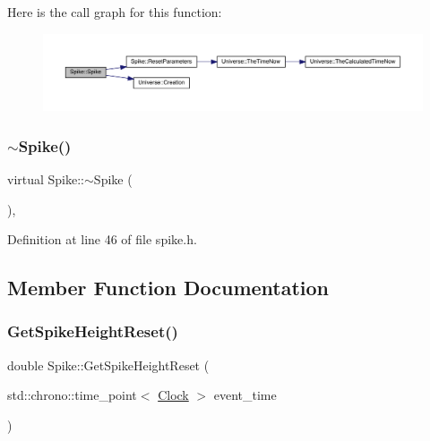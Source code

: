Here is the call graph for this function\+:\nopagebreak
\begin{figure}[H]
\begin{center}
\leavevmode
\includegraphics[width=350pt]{class_spike_afecf811f48103b529016a73349b50fe4_cgraph}
\end{center}
\end{figure}
\mbox{\label{class_spike_a6c2c62e81cb32ca4eb73bc686974d00d}} 
\subsubsection{\texorpdfstring{$\sim$\+Spike()}{~Spike()}}
{\footnotesize\ttfamily virtual Spike\+::$\sim$\+Spike (\begin{DoxyParamCaption}{ }\end{DoxyParamCaption})\hspace{0.3cm}{\ttfamily [inline]}, {\ttfamily [virtual]}}



Definition at line 46 of file spike.\+h.



\subsection{Member Function Documentation}
\mbox{\label{class_spike_a6266871881a2581aaee499f6a10e1841}} 
\subsubsection{\texorpdfstring{Get\+Spike\+Height\+Reset()}{GetSpikeHeightReset()}}
{\footnotesize\ttfamily double Spike\+::\+Get\+Spike\+Height\+Reset (\begin{DoxyParamCaption}\item[{std\+::chrono\+::time\+\_\+point$<$ \mbox{\hyperlink{universe_8h_a0ef8d951d1ca5ab3cfaf7ab4c7a6fd80}{Clock}} $>$}]{event\+\_\+time }\end{DoxyParamCaption})\hspace{0.3cm}{\ttfamily [inline]}}




